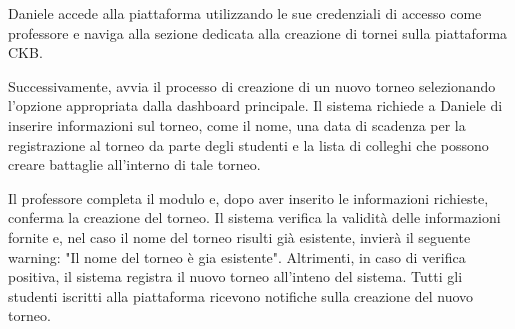 \begin{enumerate}[label=\textbf{\Alph*}.]
Daniele accede alla piattaforma utilizzando le sue credenziali di accesso come professore e naviga alla sezione dedicata alla creazione di tornei sulla piattaforma CKB.

Successivamente, avvia il processo di creazione di un nuovo torneo selezionando l'opzione appropriata dalla dashboard principale. Il sistema richiede a Daniele di inserire  informazioni sul torneo, come il nome, una data di scadenza per la registrazione al torneo da parte degli studenti e la lista di colleghi che possono creare battaglie all'interno di tale torneo.

Il professore completa il modulo e, dopo aver inserito  le informazioni richieste, conferma la creazione del torneo. Il sistema verifica la validità delle informazioni fornite e, nel caso il nome del torneo risulti già esistente,  invierà il seguente warning:
"Il nome del torneo è gia esistente".
Altrimenti, in caso di verifica positiva, il sistema registra il nuovo torneo all'inteno del sistema. 
Tutti gli  studenti iscritti alla piattaforma ricevono notifiche sulla creazione del nuovo torneo.


\end{enumerate}
